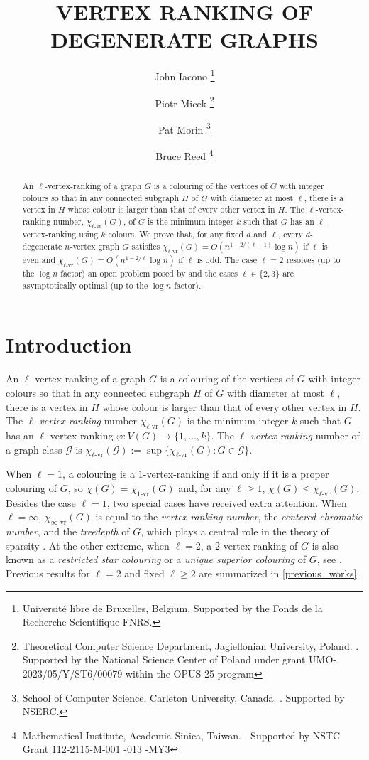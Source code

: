 \documentclass{patmorin}
\title{\MakeUppercase{Vertex Ranking of Degenerate Graphs}}
\author{%
  John Iacono%
    \thanks{Université libre de Bruxelles, Belgium.
Supported by the Fonds de la Recherche Scientifique-FNRS.} \and
  Piotr Micek%
    \thanks{Theoretical Computer Science Department, Jagiellonian University, Poland. \email{piotr.micek@uj.edu.pl}.
    Supported by the National Science Center of Poland
under grant UMO-2023/05/Y/ST6/00079 within the OPUS 25 program
      } \and
  Pat Morin%
    \thanks{School of Computer Science, Carleton University, Canada. \email{morin@scs.carleton.ca}. Supported by NSERC.}\and
  Bruce Reed%
    \thanks{Mathematical Institute, Academia Sinica, Taiwan. \email{bruce.al.reed@gmail.com}.  Supported by  NSTC Grant 112-2115-M-001 -013 -MY3}}
\newcommand{\defin}[1]{\emph{\color{brightmaroon}#1}}
\newcommand{\rn}[1]{\chi_{\operatorname{#1-vr}}}
\newcommand{\lrn}{\rn{\ell}}
\begin{document}
\maketitle

\begin{abstract}
  An $\ell$-vertex-ranking of a graph $G$ is a colouring of the vertices of $G$ with integer colours so that in any connected subgraph $H$ of $G$ with diameter at most $\ell$, there is a vertex in $H$ whose colour is larger than that of every other vertex in $H$.  The $\ell$-vertex-ranking number, $\lrn(G)$, of $G$ is the minimum integer $k$ such that $G$ has an $\ell$-vertex-ranking using $k$ colours.  We prove that, for any fixed $d$ and $\ell$, every $d$-degenerate $n$-vertex graph $G$ satisfies $\lrn(G)= O(n^{1-2/(\ell+1)}\log n)$ if $\ell$ is even and $\lrn(G)= O(n^{1-2/\ell}\log n)$ if $\ell$ is odd. The case $\ell=2$ resolves (up to the $\log n$ factor) an open problem posed by \citet{karpas.neiman.ea:on} and the cases $\ell\in\{2,3\}$ are asymptotically optimal (up to the $\log n$ factor).
\end{abstract}


\section{Introduction}

An $\ell$-vertex-ranking of a graph $G$ is a colouring of the vertices of $G$ with integer colours so that in any connected subgraph $H$ of $G$ with diameter at most $\ell$, there is a vertex in $H$ whose colour is larger than that of every other vertex in $H$.  The \defin{$\ell$-vertex-ranking} number $\lrn(G)$ is the minimum integer $k$ such that $G$ has an $\ell$-vertex-ranking $\varphi:V(G)\to\{1,\ldots,k\}$. The \defin{$\ell$-vertex-ranking} number of a graph class $\mathcal{G}$ is $\lrn(\mathcal{G}):=\sup\{\lrn(G):G\in\mathcal{G}\}$.

When $\ell=1$, a colouring is a $1$-vertex-ranking if and only if it is a proper colouring of $G$, so $\chi(G)=\rn{1}(G)$ and, for any $\ell\ge 1$, $\chi(G)\le \lrn(G)$.  Besides the case $\ell=1$, two special cases have received extra attention.  When $\ell=\infty$, $\rn{\infty}(G)$ is equal to the \defin{vertex ranking number}, the \defin{centered chromatic number}, and the \defin{treedepth} of $G$,
which plays a central role in the theory of sparsity  \cite{nesetril.ossona:tree-depth,nesetril.ossona:sparsity}.
At the other extreme, when $\ell=2$, a $2$-vertex-ranking of $G$ is also known as a \defin{restricted star colouring} \cite{shalu.antony:complexity} or a \defin{unique superior colouring} of $G$,
see \cite{karpas.neiman.ea:on}.  Previous results for $\ell=2$ and fixed $\ell\ge 2$ are summarized in \cref{previous_works}.
\end{document}
